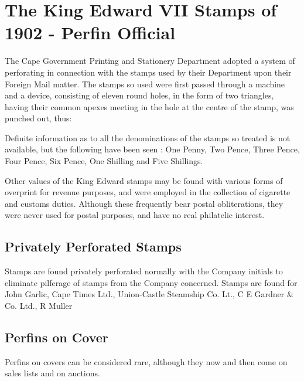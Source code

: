 \section{The King Edward VII Stamps of 1902 - Perfin Official
} 

The Cape Government Printing and Stationery Department adopted a system of perforating in connection with the stamps used by their Department upon their Foreign Mail matter. The stamps so used were first passed through a machine and a device, consisting of eleven round holes, in the form of two triangles, having their common apexes meeting in the hole at the centre of the stamp, was punched out, thus:

Definite information as to all the denominations of the stamps so treated is not available, but the following have been seen : One Penny, Two Pence, Three Pence, Four Pence, Six Pence, One Shilling and Five Shillings.


Other values of the King Edward stamps may be found with various forms of overprint for revenue purposes,
 and were employed in the collection of cigarette and customs duties. 
Although these frequently bear postal oblitera­tions, they were never 
used for postal purposes, and have no real philatelic interest.


\subsection{Privately Perforated Stamps}


Stamps are found privately perforated normally with the Company initials to eliminate pilferage of stamps from the Company concerned.
Stamps are found for John Garlic, Cape Times Ltd., Union-Castle Steamship Co. Lt., C E Gardner & Co. Ltd., R Muller

\subsection{Perfins on Cover
} Perfins on covers can be considered rare, although they now and then come on sales lists and on auctions.

                  